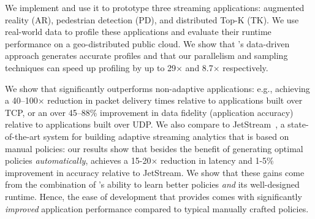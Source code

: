 \begin{enumerate}
\end{enumerate}

We implement \sysname{} and use it to prototype three streaming applications:
augmented reality (AR), pedestrian detection (PD), and distributed Top-K
(TK). We use real-world data to profile these applications and evaluate their
runtime performance on a geo-distributed public cloud.  We show that
\sysname{}'s data-driven approach generates accurate profiles and that our
parallelism and sampling techniques can speed up profiling by up to 29$\times$
and 8.7$\times$ respectively.

We show that \sysname{} significantly outperforms non-adaptive applications:
e.g., achieving a 40--100$\times$ reduction in packet delivery times relative to
applications built over TCP, or an over 45--88\% improvement in data fidelity
(application accuracy) relative to applications built over UDP.  We also compare
\sysname{} to JetStream~\cite{rabkin2014aggregation}, a state-of-the-art system
for building adaptive streaming analytics that is based on manual policies: our
results show that besides the benefit of generating optimal policies
\textit{automatically}, \sysname{} achieves a 15-20$\times$ reduction in latency
and 1-5\% improvement in accuracy relative to JetStream. We show that these
gains come from the combination of \sysname{}'s ability to learn better policies
\emph{and} its well-designed runtime.  Hence, the ease of development that
\sysname{} provides comes with significantly \emph{improved} application
performance compared to typical manually crafted policies.


